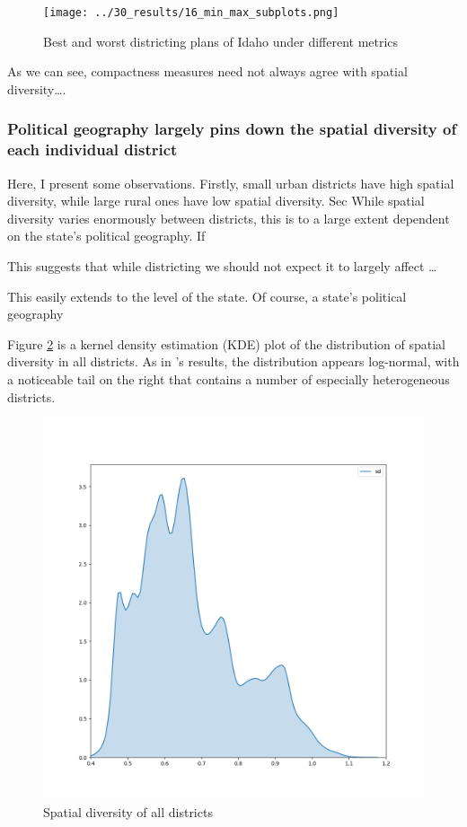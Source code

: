 \documentclass[]{article}
\begin{document}
\begin{figure}
\centering
\texttt{[image: ../30\_results/16\_min\_max\_subplots.png]}
\caption{Best and worst districting plans of Idaho under different
metrics \label{idaho_minmax}}
\end{figure}

As we can see, compactness measures need not always agree with spatial
diversity\ldots{}.

\hypertarget{political-geography-largely-pins-down-the-spatial-diversity-of-each-individual-district}{%
\subsubsection{Political geography largely pins down the spatial
diversity of each individual
district}\label{political-geography-largely-pins-down-the-spatial-diversity-of-each-individual-district}}

Here, I present some observations. Firstly, small urban districts have
high spatial diversity, while large rural ones have low spatial
diversity. Sec While spatial diversity varies enormously between
districts, this is to a large extent dependent on the state's political
geography. If

This suggests that while districting we should not expect it to largely
affect \ldots{}

This easily extends to the level of the state. Of course, a state's
political geography

Figure \ref{sd_all_districts} is a kernel density estimation (KDE) plot
of the distribution of spatial diversity in all districts. As in
\citeauthor{steph2012}'s results, the distribution appears log-normal,
with a noticeable tail on the right that contains a number of especially
heterogeneous districts.

\begin{figure}
\centering
\includegraphics{../30_results/all_districts_concat_sd.png}
\caption{Spatial diversity of all districts \label{sd_all_districts}}
\end{figure}
\end{document}

